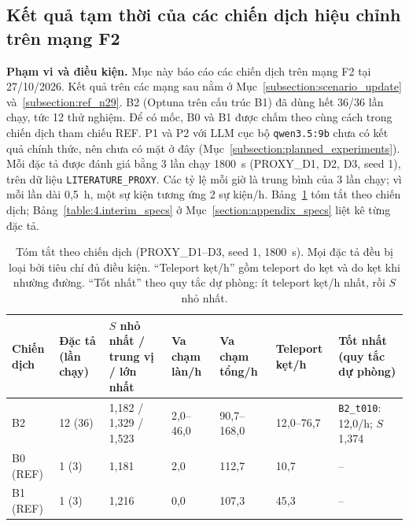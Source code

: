 \documentclass[../main.tex]{subfiles}
\begin{document}
\subsection{Kết quả tạm thời của các chiến dịch hiệu chỉnh trên mạng F2}
\label{subsection:interim}

\textbf{Phạm vi và điều kiện.} Mục này báo cáo các chiến dịch trên mạng F2 tại 27/10/2026. Kết quả trên các mạng sau nằm ở Mục~\ref{subsection:scenario_update} và~\ref{subsection:ref_n29}.
B2 (Optuna trên cấu trúc B1) đã dùng hết 36/36 lần chạy, tức 12 thử nghiệm. Để có mốc, B0 và B1 được chấm theo cùng cách trong chiến dịch tham chiếu REF. P1 và P2 với LLM cục bộ \texttt{qwen3.5:9b} chưa có kết quả chính thức, nên chưa có mặt ở đây (Mục~\ref{subsection:planned_experiments}). Mỗi đặc tả được đánh giá bằng 3 lần chạy 1800~s (PROXY\_D1, D2, D3, seed 1), trên dữ liệu \texttt{LITERATURE\_PROXY}.
Các tỷ lệ mỗi giờ là trung bình của 3 lần chạy; vì mỗi lần dài 0,5~h, một sự kiện tương ứng 2 sự kiện/h. Bảng~\ref{table:4.interim_summary} tóm tắt theo chiến dịch; Bảng~\ref{table:4.interim_specs} ở Mục~\ref{section:appendix_specs} liệt kê từng đặc tả.

\begin{table}[H]
\centering
\small\setlength{\tabcolsep}{3pt}
\caption{Tóm tắt theo chiến dịch (PROXY\_D1--D3, seed 1, 1800~s). Mọi đặc tả đều bị loại bởi tiêu chí đủ điều kiện. ``Teleport kẹt/h'' gồm teleport do kẹt và do kẹt khi nhường đường. ``Tốt nhất'' theo quy tắc dự phòng: ít teleport kẹt/h nhất, rồi $S$ nhỏ nhất.} \label{table:4.interim_summary}
\begin{tabular}{|p{1.5cm}|p{1.5cm}|p{2.6cm}|p{1.5cm}|p{1.7cm}|p{1.5cm}|p{2.6cm}|}
\hline
\textbf{Chiến dịch} & \textbf{Đặc tả (lần chạy)} & \textbf{$S$ nhỏ nhất / trung vị / lớn nhất} & \textbf{Va chạm làn/h} & \textbf{Va chạm tổng/h} & \textbf{Teleport kẹt/h} & \textbf{Tốt nhất (quy tắc dự phòng)} \\ \hline
B2 & 12 (36) & 1,182 / 1,329 / 1,523 & 2,0--46,0 & 90,7--168,0 & 12,0--76,7 & \texttt{B2\_\allowbreak t010}: 12,0/h; $S$ 1,374 \\ \hline
B0 (REF) & 1 (3) & 1,181 & 2,0 & 112,7 & 10,7 & -- \\ \hline
B1 (REF) & 1 (3) & 1,216 & 0,0 & 107,3 & 45,3 & -- \\ \hline
\end{tabular}
\end{table}
\end{document}
